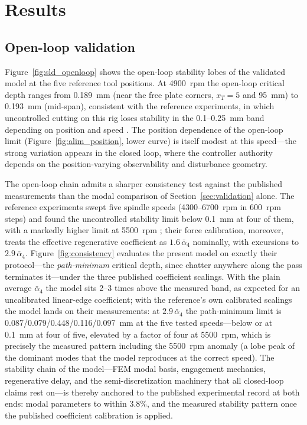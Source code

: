 \documentclass[preprint,12pt]{elsarticle}
\begin{document}
\section{Results}
\label{sec:results}

\subsection{Open-loop validation}
\label{sec:olvalidation}

Figure~\ref{fig:sld_openloop} shows the open-loop stability lobes of the
validated model at the five reference tool positions. At 4900~rpm the
open-loop critical depth ranges from 0.189~mm (near the free plate
corners, $x_T = 5$ and 95~mm) to 0.193~mm (mid-span), consistent with
the reference experiments, in which uncontrolled cutting on this rig
loses stability in the 0.1--0.25~mm band depending on position and speed
\cite{du2024robust}. The position dependence of the open-loop limit
(Figure~\ref{fig:alim_position}, lower curve) is itself modest at this
speed---the strong variation appears in the closed loop, where the
controller authority depends on the position-varying observability and
disturbance geometry.

The open-loop chain admits a sharper consistency test against the
published measurements than the modal comparison of
Section~\ref{sec:validation} alone. The reference experiments swept
five spindle speeds (4300--6700~rpm in 600~rpm steps) and found the
uncontrolled stability limit below 0.1~mm at four of them, with a
markedly higher limit at 5500~rpm \cite{du2024robust}; their force
calibration, moreover, treats the effective regenerative coefficient
as $1.6\,\bar{\alpha}_4$ nominally, with excursions to
$2.9\,\bar{\alpha}_4$. Figure~\ref{fig:consistency} evaluates the
present model on exactly their protocol---the \emph{path-minimum}
critical depth, since chatter anywhere along the pass terminates
it---under the three published coefficient scalings. With the plain
average $\bar{\alpha}_4$ the model sits 2--3 times above the measured
band, as expected for an uncalibrated linear-edge coefficient; with the
reference's own calibrated scalings the model lands on their
measurements: at $2.9\,\bar{\alpha}_4$ the path-minimum limit is
0.087/0.079/0.448/0.116/0.097~mm at the five tested speeds---below or
at 0.1~mm at four of five, elevated by a factor of four at 5500~rpm,
which is precisely the measured pattern including the 5500~rpm
anomaly (a lobe peak of the dominant modes that the model reproduces
at the correct speed). The stability chain of the model---FEM modal
basis, engagement mechanics, regenerative delay, and the
semi-discretization machinery that all closed-loop claims rest
on---is thereby anchored to the published experimental record at both
ends: modal parameters to within 3.8\%, and the measured stability
pattern once the published coefficient calibration is applied.
\end{document}

